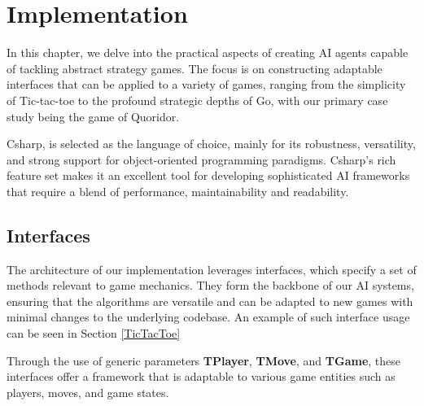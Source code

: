 \chapter{Implementation}\label{Implementation}

In this chapter, we delve into the practical aspects of creating \gls{AI} agents capable of tackling abstract strategy games. The focus is on constructing adaptable interfaces that can be applied to a variety of games, ranging from the simplicity of Tic-tac-toe to the profound strategic depths of Go, with our primary case study being the game of Quoridor.

\gls{Csharp}, is selected as the language of choice, mainly for its robustness, versatility, and strong support for object-oriented programming paradigms. \gls{Csharp}'s rich feature set makes it an excellent tool for developing sophisticated \gls{AI} frameworks that require a blend of performance, maintainability and readability.

\section{Interfaces}
\label{game_interface_def}
The architecture of our implementation leverages interfaces, which specify a set of methods relevant to game mechanics. They form the backbone of our \gls{AI} systems, ensuring that the algorithms are versatile and can be adapted to new games with minimal changes to the underlying codebase. An example of such interface usage can be seen in Section \ref{TicTacToe}

Through the use of generic parameters \textbf{TPlayer}, \textbf{TMove}, and \textbf{TGame}, these interfaces offer a framework that is adaptable to various game entities such as players, moves, and game states.

